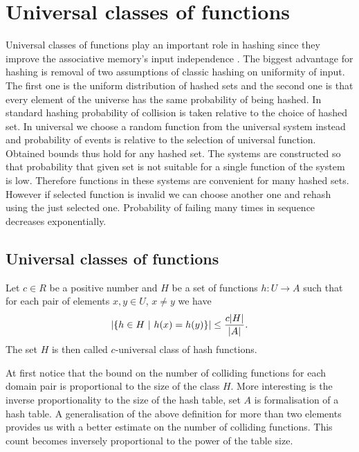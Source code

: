 \chapter{Universal classes of functions}

Universal classes of functions play an important role in hashing since they improve the associative memory's input independence
. The biggest advantage for hashing is removal of two assumptions of classic hashing on uniformity of input. The first one is the uniform distribution of hashed sets and the second one is that every element of the universe has the same probability of being hashed. In standard hashing probability of collision is taken relative to the choice of hashed set. In universal we choose a random function from the universal system instead and probability of events is relative to the selection of universal function. Obtained bounds thus hold for any hashed set. The systems are constructed so that probability that given set is not suitable for a single function of the system is low. Therefore functions in these systems are convenient for many hashed sets. However if selected function is invalid we can choose another one and rehash using the just selected one. Probability of failing many times in sequence decreases exponentially.

\section{Universal classes of functions}

\begin{definition}
\label{c_universal_system}
Let $c \in R$ be a positive number and $H$ be a set of functions $h: U \rightarrow A$ such that for each pair of elements $x, y \in U$, $x \neq y$ we have \[ \left| \lbrace h \in H \ | \  h(x) = h(y) \rbrace \right| \leq \frac {c |H|}{|A|} \textit{.} \] The set $H$ is then called $c$-universal class of hash functions.
\end{definition}

At first notice that the bound on the number of colliding functions for each domain pair is proportional to the size of the class $H$. More interesting is the inverse proportionality to the size of the hash table, set $A$ is formalisation of a hash table. A generalisation of the above definition for more than two elements provides us with a better estimate on the number of colliding functions. This count becomes inversely proportional to the power of the table size.

